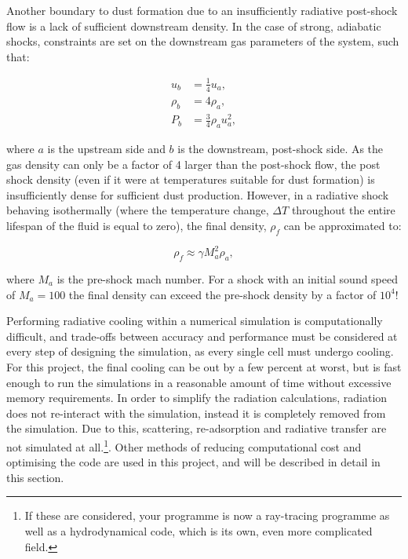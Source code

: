 Another boundary to dust formation due to an insufficiently radiative post-shock flow is a lack of sufficient downstream density.
In the case of strong, adiabatic shocks, constraints are set on the downstream gas parameters of the system, such that:

\begin{subequations}
  \begin{align}
    u_b    & = \frac{1}{4} u_a , \\
    \rho_b & = 4 \rho_a , \\ 
    P_b    & = \frac{3}{4} \rho_a u_a^2 ,
  \end{align}
\end{subequations}

\noindent
where $a$ is the upstream side and $b$ is the downstream, post-shock side.
As the gas density can only be a factor of 4 larger than the post-shock flow, the post shock density (even if it were at  temperatures suitable for dust formation) is insufficiently dense for sufficient dust production.
However, in a radiative shock behaving isothermally (where the temperature change, $\Delta T$ throughout the entire lifespan of the fluid is equal to zero), the final density, $\rho_f$ can be approximated to:

\begin{equation}
  \rho_f \approx \gamma M_a^2 \rho_a,
\end{equation}

\noindent
where $M_a$ is the pre-shock mach number.
For a shock with an initial sound speed of $M_a = 100$ the final density can exceed the pre-shock density by a factor of $10^4$!


Performing radiative cooling within a numerical simulation is computationally difficult, and trade-offs between accuracy and performance must be considered at every step of designing the simulation, as every single cell must undergo cooling.
For this project, the final cooling can be out by a few percent at worst, but is fast enough to run the simulations in a reasonable amount of time without excessive memory requirements.
In order to simplify the radiation calculations, radiation does not re-interact with the simulation, instead it is completely removed from the simulation.
Due to this, scattering, re-adsorption and radiative transfer are not simulated at all.\footnote{If these are considered, your programme is now a ray-tracing programme as well as a hydrodynamical code, which is its own, even more complicated field.}.
Other methods of reducing computational cost and optimising the code are used in this project, and will be described in detail in this section.

